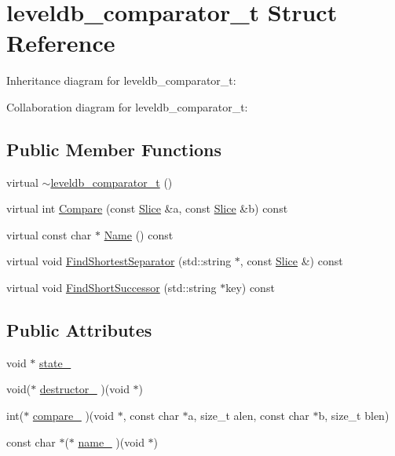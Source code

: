\hypertarget{structleveldb__comparator__t}{\section{leveldb\-\_\-comparator\-\_\-t Struct Reference}
\label{structleveldb__comparator__t}
}


Inheritance diagram for leveldb\-\_\-comparator\-\_\-t\-:


Collaboration diagram for leveldb\-\_\-comparator\-\_\-t\-:
\subsection*{Public Member Functions}
\begin{DoxyCompactItemize}
\item 
virtual \hyperlink{structleveldb__comparator__t_a6717afb2ab1eebb8402b63f00a6d1c35}{$\sim$leveldb\-\_\-comparator\-\_\-t} ()
\item 
virtual int \hyperlink{structleveldb__comparator__t_af340b22c2639696019e13c7bd153d189}{Compare} (const \hyperlink{classleveldb_1_1_slice}{Slice} \&a, const \hyperlink{classleveldb_1_1_slice}{Slice} \&b) const 
\item 
virtual const char $\ast$ \hyperlink{structleveldb__comparator__t_a3b408bc62e1033237b0ef68cfeac7741}{Name} () const 
\item 
virtual void \hyperlink{structleveldb__comparator__t_abbcfac3b28ea84a6ea347be48e1af2f8}{Find\-Shortest\-Separator} (std\-::string $\ast$, const \hyperlink{classleveldb_1_1_slice}{Slice} \&) const 
\item 
virtual void \hyperlink{structleveldb__comparator__t_ad84aa86465a71203cdfd7cac02d85054}{Find\-Short\-Successor} (std\-::string $\ast$key) const 
\end{DoxyCompactItemize}
\subsection*{Public Attributes}
\begin{DoxyCompactItemize}
\item 
void $\ast$ \hyperlink{structleveldb__comparator__t_a720da927befa8098f21437c663d0b0e2}{state\-\_\-}
\item 
void($\ast$ \hyperlink{structleveldb__comparator__t_ae6edd4c00eb7f3769bc8c4c8ef4aece5}{destructor\-\_\-} )(void $\ast$)
\item 
int($\ast$ \hyperlink{structleveldb__comparator__t_a748ab1b07994228298b24331239dc3be}{compare\-\_\-} )(void $\ast$, const char $\ast$a, size\-\_\-t alen, const char $\ast$b, size\-\_\-t blen)
\item 
const char $\ast$($\ast$ \hyperlink{structleveldb__comparator__t_ae639c988e591198174fbc7d043af8d2b}{name\-\_\-} )(void $\ast$)
\end{DoxyCompactItemize}



